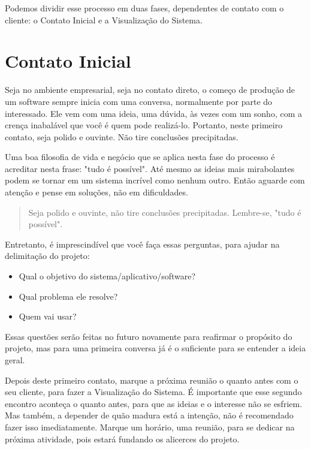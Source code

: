 \documentclass[a4paper, 12pt, oneside]{book}
\begin{document}
Podemos dividir esse processo em duas fases, dependentes de contato com o cliente: o Contato Inicial e a Visualização do Sistema.

\section*{Contato Inicial}

Seja no ambiente empresarial, seja no contato direto, o começo de produção de um software sempre inicia com uma conversa, normalmente por parte do interessado. Ele vem com uma ideia, uma dúvida, às vezes com um sonho, com a crença inabalável que você é quem pode realizá-lo. Portanto, neste primeiro contato, seja polido e ouvinte. Não tire conclusões precipitadas.

Uma boa filosofia de vida e negócio que se aplica nesta fase do processo é acreditar nesta frase: "tudo é possível". Até mesmo as ideias mais mirabolantes podem se tornar em um sistema incrível como nenhum outro. Então aguarde com atenção e pense em soluções, não em dificuldades.

\begin{quote}
	\begin{flushright}
		Seja polido e ouvinte, não tire conclusões precipitadas. Lembre-se, "tudo é possível".
	\end{flushright}
\end{quote}

Entretanto, é imprescindível que você faça essas perguntas, para ajudar na delimitação do projeto:
\begin{itemize}
	\item Qual o objetivo do sistema/aplicativo/software?
	\item Qual problema ele resolve?
	\item Quem vai usar?
\end{itemize}

Essas questões serão feitas no futuro novamente para reafirmar o propósito do projeto, mas para uma primeira conversa já é o suficiente para se entender a ideia geral.

Depois deste primeiro contato, marque a próxima reunião o quanto antes com o seu cliente, para fazer a Visualização do Sistema. É importante que esse segundo encontro aconteça o quanto antes, para que as ideias e o interesse não se esfriem. Mas também, a depender de quão madura está a intenção, não é recomendado fazer isso imediatamente. Marque um horário, uma reunião, para se dedicar na próxima atividade, pois estará fundando os alicerces do projeto.
\end{document}

